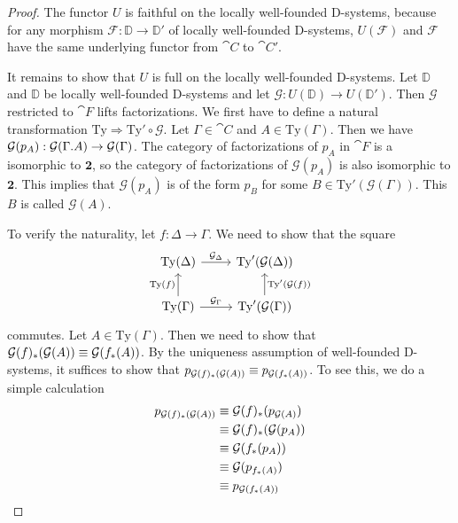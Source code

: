 \begin{proof}
The functor $U$ is faithful on the locally well-founded D-systems, because for any morphism 
$\mathcal{F}:\mathbb{D}\to\mathbb{D}'$ of locally well-founded D-systems, 
$U(\mathcal{F})$ and $\mathcal{F}$ have the same underlying functor
from $\cat{C}$ to $\cat{C}'$. 

It remains to show that $U$ is full on the locally well-founded D-systems. Let
$\mathbb{D}$ and $\mathbb{D}$ be locally well-founded D-systems and let $\mathcal{G}:U(\mathbb{D})
\to U(\mathbb{D}')$. Then $\mathcal{G}$ restricted to $\cat{F}$ lifts factorizations.
We  first have to define a natural transformation
$\mathrm{Ty}\Rightarrow \mathrm{Ty}'\circ\mathcal{G}$. Let
$\Gamma\in\cat{C}$ and $A\in\mathrm{Ty}(\Gamma)$. Then we have
$\mathcal{G}(p_A):\mathcal{G}(\ctxext{\Gamma}{A})\to \mathcal{G}(\Gamma)$.
The category of factorizations of $p_A$ in $\cat{F}$ is a isomorphic to $\mathbf{2}$,
so the category of factorizations of $\mathcal{G}(p_A)$ is also isomorphic to
$\mathbf{2}$. This implies that $\mathcal{G}(p_A)$ is of the form $p_B$ for
some $B\in\mathrm{Ty}'(\mathcal{G}(\Gamma))$. This $B$ is called $\mathcal{G}(A)$.

To verify the naturality, let $f:\Delta\to\Gamma$. We need to show that the
square
\begin{equation*}
\begin{tikzcd}
\mathrm{Ty}(\Delta) \arrow[r,"{\mathcal{G}_\Delta}"] & \mathrm{Ty}'(\mathcal{G}(\Delta)) \\
\mathrm{Ty}(\Gamma) \arrow[u,"\mathrm{Ty}(f)"] \arrow[r,"{\mathcal{G}_\Gamma}"] &
\mathrm{Ty}'(\mathcal{G}(\Gamma)) \arrow[u,swap,"{\mathrm{Ty}'(\mathcal{G}(f))}"]
\end{tikzcd}
\end{equation*}
commutes. Let $A\in\mathrm{Ty}(\Gamma)$. Then we need to show that
$\mathcal{G}(f)_\ast(\mathcal{G}(A))\equiv \mathcal{G}(f_\ast(A))$. By the uniqueness
assumption of well-founded D-systems, it suffices to show that
$p_{\mathcal{G}(f)_\ast(\mathcal{G}(A))}\equiv p_{\mathcal{G}(f_\ast(A))}$. To
see this, we do a simple calculation
\begin{align*}
p_{\mathcal{G}(f)_\ast(\mathcal{G}(A))}
& \equiv \mathcal{G}(f)_\ast(p_{\mathcal{G}(A)}) \\
& \equiv \mathcal{G}(f)_\ast(\mathcal{G}(p_A)) \\
& \equiv \mathcal{G}(f_\ast(p_A)) \\
& \equiv \mathcal{G}(p_{f_\ast(A)}) \\
& \equiv p_{\mathcal{G}(f_\ast(A))} \qedhere
\end{align*}
\end{proof}

